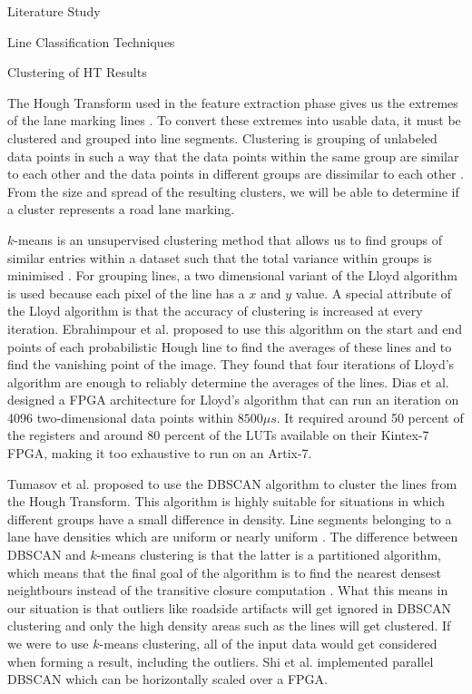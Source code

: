 \documentclass{matthijs}
\begin{document}
\begin{hoofdstuk}{Literature Study}
\begin{paragraaf}{Line Classification Techniques}
			\begin{subparagraaf}{Clustering of HT Results}

				The Hough Transform used in the feature extraction phase gives us the extremes of the lane marking lines \cite{gupta2016automated}.
				To convert these extremes into usable data, it must be clustered and grouped into line segments.
				Clustering is grouping of unlabeled data points in such a way that the data points within the same group are similar to each other and the data points in different groups are dissimilar to each other \cite{sharma2020kmeans}.
				From the size and spread of the resulting clusters, we will be able to determine if a cluster represents a road lane marking.
				\bigskip

				$k$-means is an unsupervised clustering method that allows us to find groups of similar entries within a dataset such that the total variance within groups is minimised \cite{martin2019implementing}.
				For grouping lines, a two dimensional variant of the Lloyd algorithm is used because each pixel of the line has a $x$ and $y$ value.
				A special attribute of the Lloyd algorithm is that the accuracy of clustering is increased at every iteration.
				Ebrahimpour et al. \cite{ebrahimpour2012vanishing} proposed to use this algorithm on the start and end points of each probabilistic Hough line to find the averages of these lines and to find the vanishing point of the image.
				They found that four iterations of Lloyd's algorithm are enough to reliably determine the averages of the lines.
				Dias et al. \cite{dias2020parallel} designed a FPGA architecture for Lloyd's algorithm that can run an iteration on 4096 two-dimensional data points within $8500 \mu s$.
				It required around 50 percent of the registers and around 80 percent of the LUTs available on their Kintex-7 FPGA, making it too exhaustive to run on an Artix-7.

				\bigskip

				Tumasov et al. \cite{tumasov2021research} proposed to use the DBSCAN algorithm to cluster the lines from the Hough Transform.
				This algorithm is highly suitable for situations in which different groups have a small difference in density.
				Line segments belonging to a lane have densities which are uniform or nearly uniform \cite{niu2016robust}.
				The difference between DBSCAN and $k$-means clustering is that the latter is a partitioned algorithm, which means that the final goal of the algorithm is to find the nearest densest neightbours instead of the transitive closure computation \cite{shi2014fpga}.
				What this means in our situation is that outliers like roadside artifacts will get ignored in DBSCAN clustering and only the high density areas such as the lines will get clustered.
				If we were to use $k$-means clustering, all of the input data would get considered when forming a result, including the outliers.
				Shi et al. \cite{shi2014fpga} implemented parallel DBSCAN which can be horizontally scaled over a FPGA.


\end{subparagraaf}
\end{paragraaf}
\end{hoofdstuk}
\end{document}
